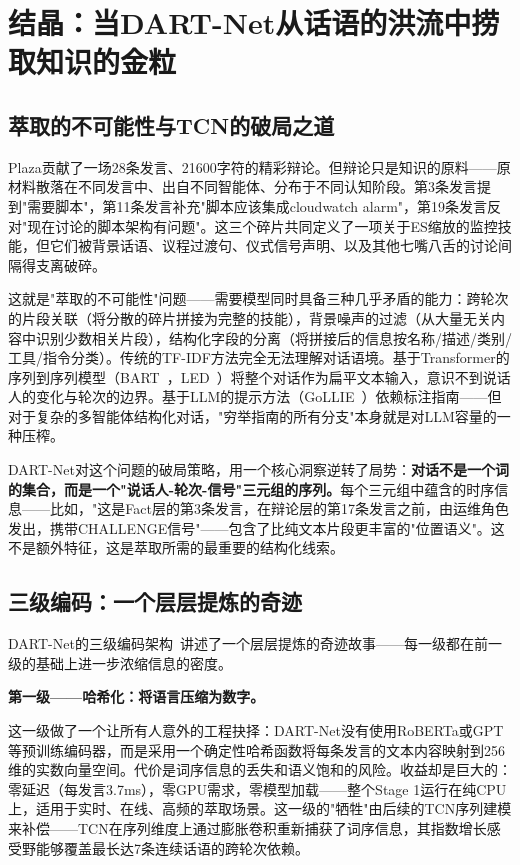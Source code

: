 \documentclass[twocolumn,10.5pt]{ctexart}
\begin{document}
\section{结晶：当DART-Net从话语的洪流中捞取知识的金粒}

\subsection{萃取的不可能性与TCN的破局之道}

Plaza贡献了一场28条发言、21600字符的精彩辩论。但辩论只是知识的原料——原材料散落在不同发言中、出自不同智能体、分布于不同认知阶段。第3条发言提到"需要脚本"，第11条发言补充"脚本应该集成cloudwatch alarm"，第19条发言反对"现在讨论的脚本架构有问题"。这三个碎片共同定义了一项关于ES缩放的监控技能，但它们被背景话语、议程过渡句、仪式信号声明、以及其他七嘴八舌的讨论间隔得支离破碎。

这就是"萃取的不可能性"问题——需要模型同时具备三种几乎矛盾的能力：跨轮次的片段关联（将分散的碎片拼接为完整的技能），背景噪声的过滤（从大量无关内容中识别少数相关片段），结构化字段的分离（将拼接后的信息按名称/描述/类别/工具/指令分类）。传统的TF-IDF方法完全无法理解对话语境。基于Transformer的序列到序列模型（BART~\cite{lewis2019bart}，LED~\cite{beltagy2020longformer}）将整个对话作为扁平文本输入，意识不到说话人的变化与轮次的边界。基于LLM的提示方法（GoLLIE~\cite{sainz2023gollie}）依赖标注指南——但对于复杂的多智能体结构化对话，"穷举指南的所有分支"本身就是对LLM容量的一种压榨。

DART-Net对这个问题的破局策略，用一个核心洞察逆转了局势：\textbf{对话不是一个词的集合，而是一个"说话人-轮次-信号"三元组的序列。}每个三元组中蕴含的时序信息——比如，"这是Fact层的第3条发言，在辩论层的第17条发言之前，由运维角色发出，携带CHALLENGE信号"——包含了比纯文本片段更丰富的"位置语义"。这不是额外特征，这是萃取所需的最重要的结构化线索。

\subsection{三级编码：一个层层提炼的奇迹}

DART-Net的三级编码架构~\cite{bai2018tcn}讲述了一个层层提炼的奇迹故事——每一级都在前一级的基础上进一步浓缩信息的密度。

\textbf{第一级——哈希化：将语言压缩为数字。}

这一级做了一个让所有人意外的工程抉择：DART-Net没有使用RoBERTa或GPT等预训练编码器，而是采用一个确定性哈希函数将每条发言的文本内容映射到256维的实数向量空间。代价是词序信息的丢失和语义饱和的风险。收益却是巨大的：零延迟（每发言3.7ms），零GPU需求，零模型加载——整个Stage 1运行在纯CPU上，适用于实时、在线、高频的萃取场景。这一级的"牺牲"由后续的TCN序列建模来补偿——TCN在序列维度上通过膨胀卷积重新捕获了词序信息，其指数增长感受野能够覆盖最长达7条连续话语的跨轮次依赖。
\end{document}
